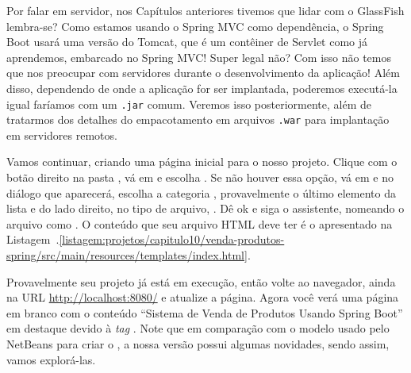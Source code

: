 Por falar em servidor, nos Capítulos anteriores tivemos que lidar com o GlassFish lembra-se? Como estamos usando o Spring MVC como dependência, o Spring Boot usará uma versão do Tomcat, que é um contêiner de Servlet como já aprendemos, embarcado no Spring MVC! Super legal não? Com isso não temos que nos preocupar com servidores durante o desenvolvimento da aplicação! Além disso, dependendo de onde a aplicação for ser implantada, poderemos executá-la igual faríamos com um \texttt{.jar} comum. Veremos isso posteriormente, além de tratarmos dos detalhes do empacotamento em arquivos \texttt{.war} para implantação em servidores remotos.

Vamos continuar, criando uma página inicial para o nosso projeto. Clique com o botão direito na pasta , vá em  e escolha . Se não houver essa opção, vá em  e no diálogo que aparecerá, escolha a categoria , provavelmente o último elemento da lista e do lado direito, no tipo de arquivo, . Dê ok e siga o assistente, nomeando o arquivo como . O conteúdo que seu arquivo HTML deve ter é o apresentado na Listagem~\thechapter.\ref{listagem:projetos/capitulo10/venda-produtos-spring/src/main/resources/templates/index.html}.


Provavelmente seu projeto já está em execução, então volte ao navegador, ainda na URL \url{http://localhost:8080/} e atualize a página. Agora você verá uma página em branco com o conteúdo ``Sistema de Venda de Produtos Usando Spring Boot'' em destaque devido à \textit{tag} . Note que em comparação com o modelo usado pelo NetBeans para criar o , a nossa versão possui algumas novidades, sendo assim, vamos explorá-las.


